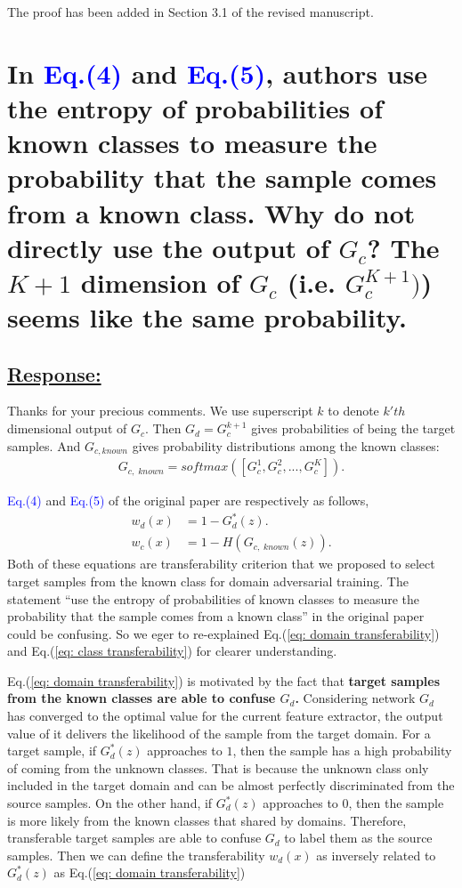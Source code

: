 The proof has been added in Section 3.1 of the revised manuscript.

\section{In \textcolor{blue}{Eq.(4)} and \textcolor{blue}{Eq.(5)}, authors use the entropy of probabilities of known classes to measure the probability that the sample comes from a known class. Why do not directly use the output of $G_c$? The $K+1$ dimension of $G_c$  (i.e. $G_c^{K+1})$) seems like the same probability. }

\subsection*{\underline{\textbf{Response:}}}


Thanks for your precious comments. 
We use superscript $k$ to denote $k'th$ dimensional output of $G_c$. 
Then $G_d=G_c^{k+1}$ gives probabilities of being the target samples.
And $G_{c,known}$ gives probability distributions among the known classes:
\begin{equation}
    \begin{split}
        G_{c,\; known}=softmax([G_c^1,G_c^2,...,G_c^K]).
    \end{split}
\end{equation} 

\textcolor{blue}{Eq.(4)} and \textcolor{blue}{Eq.(5)} of the original paper are respectively as follows,
\begin{align}
    w_d(x) &= 1-G_d^*(z). \label{eq: domain transferability}\\ 
    w_c(x) &=1-H(G_{c,\; known}(z)). \label{eq: class transferability}
\end{align}
Both of these equations are transferability criterion that we proposed to select target samples from the known class for domain adversarial training. 
The statement ``use the entropy of probabilities of known classes to measure the probability that the sample comes from a known class'' in the original paper could be confusing.
So we eger to re-explained Eq.(\ref{eq: domain transferability}) and Eq.(\ref{eq: class transferability}) for clearer understanding.

Eq.(\ref{eq: domain transferability}) is motivated by the fact that \textbf{target samples from the known classes are able to confuse $G_d$.}
Considering network $G_d$ has converged to the optimal value for the current feature extractor, the output value of it delivers the likelihood of the sample from the target domain. 
For a target sample, if $G_d^*(z)$ approaches to $1$, then the sample has a high probability of coming from the unknown classes.
That is because the unknown class only included in the target domain and can be almost perfectly discriminated from the source samples. 
On the other hand, if $G_d^*(z)$ approaches to $0$, then the sample is more likely from the known classes that shared by domains. 
Therefore, transferable target samples are able to confuse $G_d$ to label them as the source samples.
Then we can define the transferability $w_d(x)$ as inversely related to $G_d^*(z)$ as Eq.(\ref{eq: domain transferability})


